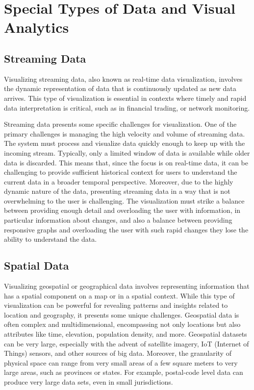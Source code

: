 \section{Special Types of Data and Visual Analytics}

\subsection*{Streaming Data}

Visualizing streaming data, also known as real-time data visualization, involves the dynamic representation of data that is continuously updated as new data arrives. This type of visualization is essential in contexts where timely and rapid data interpretation is critical, such as in financial trading, or network monitoring. 

Streaming data presents some specific challenges for visualization. One of the primary challenges is managing the high velocity and volume of streaming data. The system must process and visualize data quickly enough to keep up with the incoming stream. Typically, only a limited window of data is available while older data is discarded. This means that, since the focus is on real-time data, it can be challenging to provide sufficient historical context for users to understand the current data in a broader temporal perspective. Moreover, due to the highly dynamic nature of the data, presenting streaming data in a way that is not overwhelming to the user is challenging. The visualization must strike a balance between providing enough detail and overloading the user with information, in particular information about changes, and also a balance between providing responsive graphs and overloading the user with such rapid changes they lose the ability to understand the data.

\subsection*{Spatial Data}

Visualizing geospatial or geographical data involves representing information that has a spatial component on a map or in a spatial context. While this type of visualization can be powerful for revealing patterns and insights related to location and geography, it presents some unique challenges. Geospatial data is often complex and multidimensional, encompassing not only locations but also attributes like time, elevation, population density, and more. Geospatial datasets can be very large, especially with the advent of satellite imagery, IoT (Internet of Things) sensors, and other sources of big data. Moreover, the granularity of physical space can range from very small areas of a few square meters to very large areas, such as provinces or states. For example, postal-code level data can produce very large data sets, even in small jurisdictions. 

